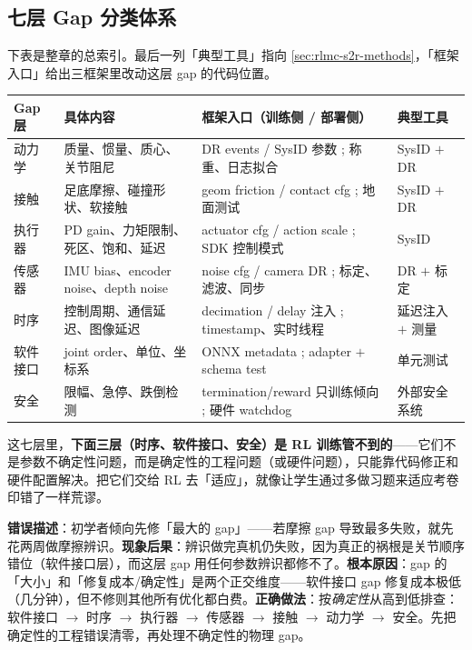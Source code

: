 \subsection{七层 Gap 分类体系}
\label{sec:rlmc-s2r-seven-layers}

下表是整章的总索引。最后一列「典型工具」指向 \cref{sec:rlmc-s2r-methods}，「框架入口」给出三框架里改动这层 gap 的代码位置。

\begin{center}
\small
\begin{tabular}{@{}lp{3.0cm}p{3.4cm}p{2.6cm}@{}}
\toprule
Gap 层 & 具体内容 & 框架入口（训练侧 / 部署侧） & 典型工具 \\
\midrule
动力学 & 质量、惯量、质心、关节阻尼 & DR events / SysID 参数 ; 称重、日志拟合 & SysID $+$ DR \\
接触 & 足底摩擦、碰撞形状、软接触 & geom friction / contact cfg ; 地面测试 & SysID $+$ DR \\
执行器 & PD gain、力矩限制、死区、饱和、延迟 & actuator cfg / action scale ; SDK 控制模式 & SysID \\
传感器 & IMU bias、encoder noise、depth noise & noise cfg / camera DR ; 标定、滤波、同步 & DR $+$ 标定 \\
时序 & 控制周期、通信延迟、图像延迟 & decimation / delay 注入 ; timestamp、实时线程 & 延迟注入 $+$ 测量 \\
软件接口 & joint order、单位、坐标系 & ONNX metadata ; adapter $+$ schema test & 单元测试 \\
安全 & 限幅、急停、跌倒检测 & termination/reward 只训练倾向 ; 硬件 watchdog & 外部安全系统 \\
\bottomrule
\end{tabular}
\end{center}

这七层里，\textbf{下面三层（时序、软件接口、安全）是 RL 训练管不到的}——它们不是参数不确定性问题，而是确定性的工程问题（或硬件问题），只能靠代码修正和硬件配置解决。把它们交给 RL 去「适应」，就像让学生通过多做习题来适应考卷印错了一样荒谬。

\begin{pitfall}
\textbf{错误描述}：初学者倾向先修「最大的 gap」——若摩擦 gap 导致最多失败，就先花两周做摩擦辨识。\textbf{现象后果}：辨识做完真机仍失败，因为真正的祸根是关节顺序错位（软件接口层），而这层 gap 用任何参数辨识都修不了。\textbf{根本原因}：gap 的「大小」和「修复成本/确定性」是两个正交维度——软件接口 gap 修复成本极低（几分钟），但不修则其他所有优化都白费。\textbf{正确做法}：按\emph{确定性}从高到低排查：软件接口 $\to$ 时序 $\to$ 执行器 $\to$ 传感器 $\to$ 接触 $\to$ 动力学 $\to$ 安全。先把确定性的工程错误清零，再处理不确定性的物理 gap。
\end{pitfall}

